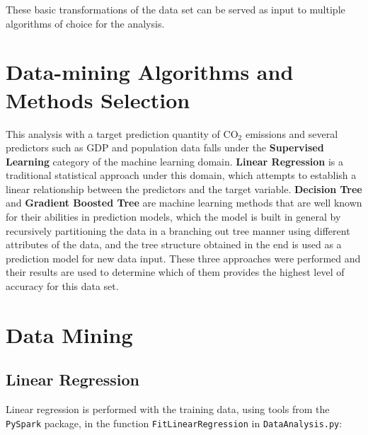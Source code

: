\documentclass[11pt,a4paper,titlepage]{article}
\begin{document}
These basic transformations of the data set can be served as input to multiple algorithms of choice for the analysis.

\section{Data-mining Algorithms and Methods Selection}

This analysis with a target prediction quantity of CO$_{2}$ emissions and several predictors such as GDP and population data falls under the \textbf{Supervised Learning} category of the machine learning domain. \textbf{Linear Regression} is a traditional statistical approach under this domain, which attempts to establish a linear relationship between the predictors and the target variable. \textbf{Decision Tree} and \textbf{Gradient Boosted Tree} are machine learning methods that are well known for their abilities in prediction models, which the model is built in general by recursively partitioning the data in a branching out tree manner using different attributes of the data, and the tree structure obtained in the end is used as a prediction model for new data input. These three approaches were performed and their results are used to determine which of them provides the highest level of accuracy for this data set.

\section{Data Mining}

\subsection{Linear Regression}

Linear regression is performed with the training data, using tools from the \texttt{PySpark} package, in the function \texttt{FitLinearRegression} in \texttt{DataAnalysis.py}:
\end{document}
